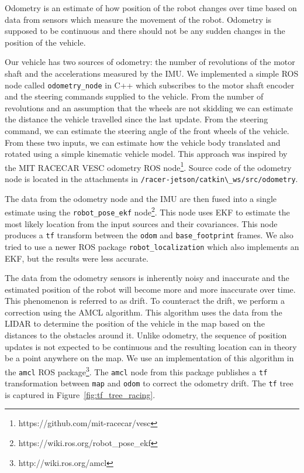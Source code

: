 Odometry is an estimate of how position of the robot changes over time based on data from sensors which measure the movement of the robot. Odometry is supposed to be continuous and there should not be any sudden changes in the position of the vehicle.

Our vehicle has two sources of odometry: the number of revolutions of the motor shaft and the accelerations measured by the IMU. We implemented a simple \gls*{ROS} node called \verb|odometry_node| in C++ which subscribes to the motor shaft encoder and the steering commands supplied to the vehicle. From the number of revolutions and an assumption that the wheels are not skidding we can estimate the distance the vehicle travelled since the last update. From the steering command, we can estimate the steering angle of the front wheels of the vehicle. From these two inputs, we can estimate how the vehicle body translated and rotated using a simple kinematic vehicle model. This approach was inspired by the MIT RACECAR VESC odometry \gls*{ROS} node\footnote{https://github.com/mit-racecar/vesc}. Source code of the odometry node is located in the attachments in \verb|/racer-jetson/catkin\_ws/src/odometry|.

The data from the odometry node and the \gls*{IMU} are then fused into a single estimate using the \verb|robot_pose_ekf| node\footnote{https://wiki.ros.org/robot\_pose\_ekf}. This node uses \gls*{EKF} to estimate the most likely location from the input sources and their covariances. This node produces a \verb|tf| transform between the \verb|odom| and \verb|base_footprint| frames. We also tried to use a newer \gls*{ROS} package \verb|robot_localization| which also implements an \gls*{EKF}, but the results were less accurate.

The data from the odometry sensors is inherently noisy and inaccurate and the estimated position of the robot will become more and more inaccurate over time. This phenomenon is referred to as drift. To counteract the drift, we perform a correction using the \gls*{AMCL} algorithm. This algorithm uses the data from the \gls*{LIDAR} to determine the position of the vehicle in the map based on the distances to the obstacles around it. Unlike odometry, the sequence of position updates is not expected to be continuous and the resulting location can in theory be a point anywhere on the map. We use an implementation of this algorithm in the \verb|amcl| \gls*{ROS} package\footnote{http://wiki.ros.org/amcl}. The \verb|amcl| node from this package publishes a \verb|tf| transformation between \verb|map| and \verb|odom| to correct the odometry drift. The \verb|tf| tree is captured in Figure~\ref{fig:tf_tree_racing}.

